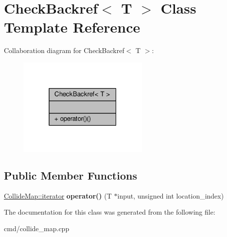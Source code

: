\hypertarget{classCheckBackref}{}\section{Check\+Backref$<$ T $>$ Class Template Reference}
\label{classCheckBackref}


Collaboration diagram for Check\+Backref$<$ T $>$\+:
\nopagebreak
\begin{figure}[H]
\begin{center}
\leavevmode
\includegraphics[width=183pt]{d5/d35/classCheckBackref__coll__graph}
\end{center}
\end{figure}
\subsection*{Public Member Functions}
\begin{DoxyCompactItemize}
\item 
\hyperlink{classCollidable}{Collide\+Map\+::iterator} {\bfseries operator()} (T $\ast$input, unsigned int location\+\_\+index)\hypertarget{classCheckBackref_a9c1a59497e384fbe7fb3c4be2b0565b8}{}\label{classCheckBackref_a9c1a59497e384fbe7fb3c4be2b0565b8}

\end{DoxyCompactItemize}


The documentation for this class was generated from the following file\+:\begin{DoxyCompactItemize}
\item 
cmd/collide\+\_\+map.\+cpp\end{DoxyCompactItemize}
